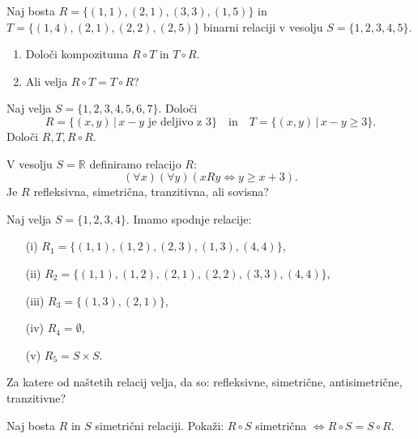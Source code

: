 \documentclass[11pt,paper=b5,footinclude,headinclude]{scrbook} %
\newtheorem{ex}{Vaja\hypertarget{sol:\theex}}[chapter]
\begin{document}
\begin{ex}
    Naj bosta $R=\{(1,1),(2,1), (3,3), (1,5)\}$  in $T=\{(1,4),(2,1), (2,2), (2,5)\}$ binarni relaciji v vesolju $S=\{1,2,3,4,5\}$. \begin{enumerate}
    \item 
Določi kompozituma  $R\circ T$ in $T\circ R$. 
\item Ali velja $R\circ T = T \circ R$?
\end{enumerate}
\end{ex}

\begin{ex}
 Naj velja  $S=\{1,2,3,4,5,6,7\}$. Določi
$$R= \{(x,y)\,|\, x-y \text{ je deljivo z  }  3\} \quad \mathrm{ in } \quad  T= \{(x,y)\,|\, x-y \geq 3\}.$$
Določi $R,T, R\circ R$.


\end{ex} \begin{ex} V vesolju  $S= \mathbb{R}$  definiramo  relacijo $R$:
$$(\forall x)(\forall y)(x R y \Leftrightarrow y \geq x +3).$$
Je $R$ refleksivna, simetrična, tranzitivna, ali sovisna?

\end{ex} \begin{ex} Naj velja  $S=\{1,2,3,4\}$. Imamo spodnje relacije:
\begin{enumerate}
\item[(i)] $R_1= \{(1,1),(1,2),(2,3), (1,3), (4,4)\}$,
\item[(ii)] $R_2= \{(1,1),(1,2),(2,1), (2,2), (3,3), (4,4)\}$,
\item[(iii)] $R_3= \{(1,3),(2,1)\}$,
\item[(iv)] $R_4= \emptyset$,
\item[(v)] $R_5= S\times S$.
\end{enumerate}
Za katere od naštetih relacij velja, da so: refleksivne, simetrične, antisimetrične, tranzitivne? 

\end{ex} \begin{ex} Naj bosta $R$ in $S$ simetrični relaciji. Pokaži: $R\circ S$ simetrična $\Leftrightarrow R\circ S = S \circ R$.


	\end{ex} 
\end{document}
